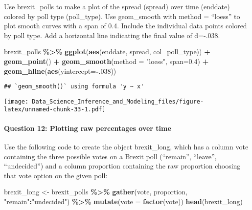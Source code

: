 \documentclass[
]{article}
\newenvironment{Shaded}{\begin{snugshade}}{\end{snugshade}}
\newcommand{\DataTypeTok}[1]{\textcolor[rgb]{0.13,0.29,0.53}{#1}}
\newcommand{\DecValTok}[1]{\textcolor[rgb]{0.00,0.00,0.81}{#1}}
\newcommand{\FloatTok}[1]{\textcolor[rgb]{0.00,0.00,0.81}{#1}}
\newcommand{\KeywordTok}[1]{\textcolor[rgb]{0.13,0.29,0.53}{\textbf{#1}}}
\newcommand{\NormalTok}[1]{#1}
\newcommand{\OperatorTok}[1]{\textcolor[rgb]{0.81,0.36,0.00}{\textbf{#1}}}
\newcommand{\StringTok}[1]{\textcolor[rgb]{0.31,0.60,0.02}{#1}}
\begin{document}
Use brexit\_polls to make a plot of the spread (spread) over time
(enddate) colored by poll type (poll\_type). Use geom\_smooth with
method = ``loess'' to plot smooth curves with a span of 0.4. Include the
individual data points colored by poll type. Add a horizontal line
indicating the final value of d=-.038.

\begin{Shaded}
\begin{Highlighting}[]
\NormalTok{brexit\_polls }\OperatorTok{\%\textgreater{}\%}
\StringTok{  }\KeywordTok{ggplot}\NormalTok{(}\KeywordTok{aes}\NormalTok{(enddate, spread, }\DataTypeTok{col=}\NormalTok{poll\_type)) }\OperatorTok{+}
\StringTok{  }\KeywordTok{geom\_point}\NormalTok{() }\OperatorTok{+}
\StringTok{  }\KeywordTok{geom\_smooth}\NormalTok{(}\DataTypeTok{method =} \StringTok{"loess"}\NormalTok{, }\DataTypeTok{span=}\FloatTok{0.4}\NormalTok{) }\OperatorTok{+}
\StringTok{  }\KeywordTok{geom\_hline}\NormalTok{(}\KeywordTok{aes}\NormalTok{(}\DataTypeTok{yintercept=}\OperatorTok{{-}}\NormalTok{.}\DecValTok{038}\NormalTok{))}
\end{Highlighting}
\end{Shaded}

\begin{verbatim}
## `geom_smooth()` using formula 'y ~ x'
\end{verbatim}

\texttt{[image: Data\_Science\_Inference\_and\_Modeling\_files/figure-latex/unnamed-chunk-33-1.pdf]}

\hypertarget{question-12-plotting-raw-percentages-over-time}{%
\paragraph{Question 12: Plotting raw percentages over
time}\label{question-12-plotting-raw-percentages-over-time}}

Use the following code to create the object brexit\_long, which has a
column vote containing the three possible votes on a Brexit poll
(``remain'', ``leave'', ``undecided'') and a column proportion
containing the raw proportion choosing that vote option on the given
poll:

\begin{Shaded}
\begin{Highlighting}[]
\NormalTok{brexit\_long \textless{}{-}}\StringTok{ }\NormalTok{brexit\_polls }\OperatorTok{\%\textgreater{}\%}
\StringTok{    }\KeywordTok{gather}\NormalTok{(vote, proportion, }\StringTok{"remain"}\OperatorTok{:}\StringTok{"undecided"}\NormalTok{) }\OperatorTok{\%\textgreater{}\%}
\StringTok{    }\KeywordTok{mutate}\NormalTok{(}\DataTypeTok{vote =} \KeywordTok{factor}\NormalTok{(vote))}
\KeywordTok{head}\NormalTok{(brexit\_long)}
\end{Highlighting}
\end{Shaded}
\end{document}
